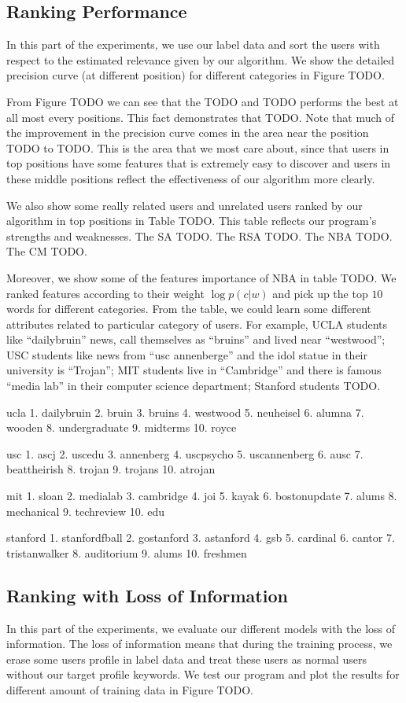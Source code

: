 \documentclass{article}
\begin{document}
\subsection{Ranking Performance}
In this part of the experiments, we use our label data and sort the users with respect to the estimated relevance given by our algorithm. We show the detailed precision curve (at different position) for different categories in Figure TODO.

From Figure TODO we can see that the TODO and TODO performs the best at all most every positions. This fact demonstrates that TODO. Note that much of the improvement in the precision curve comes in the area near the position TODO to TODO. This is the area that we most care about, since that users in top positions have some features that is extremely easy to discover and users in these middle positions reflect the effectiveness of our algorithm more clearly.

We also show some really related users and unrelated users ranked by our algorithm in top positions in Table TODO. This table reflects our program's strengths and weaknesses. The SA TODO. The RSA TODO. The NBA TODO. The CM TODO.

Moreover, we show some of the features importance of NBA in table TODO. We ranked features according to their weight $\log p(c|w)$ and pick up the top $10$ words for different categories. From the table, we could learn some different attributes related to particular category of users. For example, UCLA students like ``dailybruin'' news, call themselves as ``bruins'' and lived near ``westwood''; USC students like news from ``usc annenberge'' and the idol statue in their university is ``Trojan''; MIT students live in ``Cambridge'' and there is famous ``media lab'' in their computer science department; Stanford students TODO.

ucla
1. dailybruin
2. bruin
3. bruins
4. westwood
5. neuheisel
6. alumna
7. wooden
8. undergraduate
9. midterms
10. royce

usc
1. ascj
2. uscedu
3. annenberg
4. uscpsycho
5. uscannenberg
6. ausc
7. beattheirish
8. trojan
9. trojans
10. atrojan

mit
1. sloan
2. medialab
3. cambridge
4. joi
5. kayak
6. bostonupdate
7. alums
8. mechanical
9. techreview
10. edu

stanford
1. stanfordfball
2. gostanford
3. astanford
4. gsb
5. cardinal
6. cantor
7. tristanwalker
8. auditorium
9. alums
10. freshmen

\subsection{Ranking with Loss of Information}
In this part of the experiments, we evaluate our different models with the loss of information. The loss of information means that during the training process, we erase some users profile in label data and treat these users as normal users without our target profile keywords. We test our program and plot the results for different amount of training data in Figure TODO.
\end{document}
